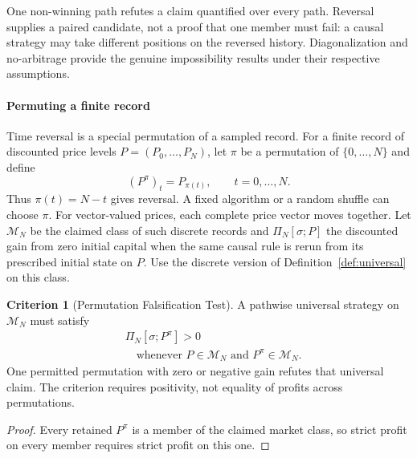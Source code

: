 \documentclass[aps,pra,reprint,superscriptaddress,amsmath,amssymb,floatfix]{revtex4-2}
\theoremstyle{plain}
\theoremstyle{definition}
\newtheorem{criterion}{Criterion}
\theoremstyle{remark}
\begin{document}
One non-winning path refutes a claim quantified over every path. Reversal
supplies a paired candidate, not a proof that one member must fail: a causal
strategy may take different positions on the reversed history.
Diagonalization and no-arbitrage provide the genuine impossibility results
under their respective assumptions.

\paragraph{Permuting a finite record}

Time reversal is a special permutation of a sampled record. For a finite
record of discounted price levels \(P=(P_0,\ldots,P_N)\), let \(\pi\) be
a permutation of \(\{0,\ldots,N\}\) and define
\begin{equation}
  (P^\pi)_t=P_{\pi(t)},\qquad t=0,\ldots,N.
  \label{eq:price-permutation}
\end{equation}
Thus \(\pi(t)=N-t\) gives reversal. A fixed algorithm or a random shuffle
can choose \(\pi\). For vector-valued prices, each complete price vector
moves together. Let \(\mathcal M_N\) be the claimed class of such discrete
records and \(\Pi_N[\sigma;P]\) the discounted gain from zero initial capital
when the same causal rule is rerun from its prescribed initial state on \(P\).
Use the discrete version of Definition~\ref{def:universal} on this class.

\begin{criterion}[Permutation Falsification Test]
  \label{crit:permutation}
  A pathwise universal strategy on \(\mathcal M_N\) must satisfy
  \begin{equation}
    \begin{aligned}
      &\Pi_N[\sigma;P^\pi]>0\\
      &\quad\text{whenever }P\in\mathcal M_N\text{ and }P^\pi\in\mathcal M_N.
    \end{aligned}
    \label{eq:permutationtest}
  \end{equation}
  One permitted permutation with zero or negative gain refutes that universal
  claim. The criterion requires positivity, not equality of profits across
  permutations.
\end{criterion}

\begin{proof}
Every retained \(P^\pi\) is a member of the claimed market class, so strict
profit on every member requires strict profit on this one.
\end{proof}
\end{document}
